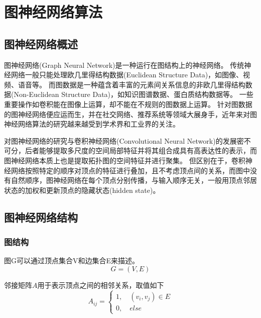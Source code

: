 
\chapter{图神经网络算法}

\section{图神经网络概述}

图神经网络(Graph Neural Network)是一种运行在图结构上的神经网络。
传统神经网络一般只能处理欧几里得结构数据(Euclidean Structure Data)，如图像、视频、语音等。
而图数据是一种蕴含着丰富的元素间关系信息的非欧几里得结构数据(Non-Euclidean Structure Data)，如知识图谱数据、蛋白质结构数据等。
一些重要操作如卷积能在图像上运算，却不能在不规则的图数据上运算。
针对图数据的图神经网络便应运而生，并在社交网络、推荐系统等领域大展身手，近年来对图神经网络算法的研究越来越受到学术界和工业界的关注。

对图神经网络的研究与卷积神经网络(Convolutional Neural Network)的发展密不可分，后者能够提取多尺度的空间局部特征并将其组合成具有高表达性的表示，而图神经网络本质上也是提取拓扑图的空间特征并进行聚集。
但区别在于，卷积神经网络按照特定的顺序对顶点的特征进行叠加，且不考虑顶点间的关系，而图中没有自然顺序，图神经网络在每个顶点分别传播，与输入顺序无关，一般用顶点邻居状态的加权和更新顶点的隐藏状态(hidden state)。

\section{图神经网络结构}

\subsection{图结构}
\begin{definition}
    图G可以通过顶点集合V和边集合E来描述。
    \begin{equation}
        G=(V,E)
    \end{equation}
\end{definition}

\begin{definition}
    邻接矩阵$A$用于表示顶点之间的相邻关系，取值如下
    \begin{equation}
    A_{ij}=\left\{ \begin{array}{lr}1, \quad (v_i,v_j)\in E\\0,\quad else \end{array}\right.
    \end{equation}
\end{definition}

